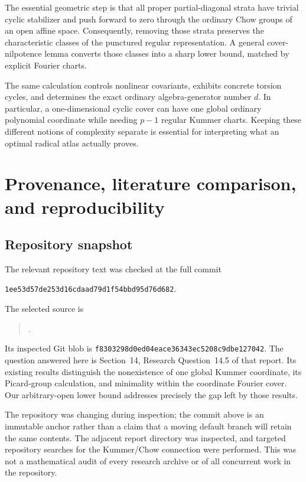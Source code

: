 \documentclass[11pt,a4paper]{article}
\theoremstyle{definition}
\theoremstyle{remark}
\newcommand{\code}[1]{{\small\nolinkurl{#1}}}
\begin{document}
The essential geometric step is that all proper partial-diagonal strata
have trivial cyclic stabilizer and push forward to zero through the
ordinary Chow groups of an open affine space. Consequently, removing
those strata preserves the characteristic classes of the punctured
regular representation. A general cover-nilpotence lemma converts those
classes into a sharp lower bound, matched by explicit Fourier charts.

The same calculation controls nonlinear covariants, exhibits concrete
torsion cycles, and determines the exact ordinary algebra-generator
number $d$. In particular, a one-dimensional cyclic cover can have one
global ordinary polynomial coordinate while needing $p-1$ regular
Kummer charts. Keeping these different notions of complexity separate
is essential for interpreting what an optimal radical atlas actually
proves.

\setcounter{section}{2}
\renewcommand{\thesection}{\Alph{section}}
\makeatletter\gdef{}\gdef\Hy@chapapp{\Hy@appendixstring}\makeatother
\section{Provenance, literature comparison, and reproducibility}
\label{ka:app:provenance}

\subsection{Repository snapshot}
The relevant repository text was checked at the full commit
\begin{center}
\code{1ee53d57de253d16cdaad79d1f54bbd95d76d682}.
\end{center}
The selected source is
\begin{quote}\small
{}\allowbreak
{}.
\end{quote}
Its inspected Git blob is
\code{f8303298d0ed04eace36343ec5208c9dbe127042}.
The question answered here is Section~14, Research Question~14.5 of
that report. Its existing results distinguish the nonexistence of one
global Kummer coordinate, its Picard-group calculation, and minimality
within the coordinate Fourier cover. Our arbitrary-open lower bound
addresses precisely the gap left by those results.

The repository was changing during inspection; the commit above is an
immutable anchor rather than a claim that a moving default branch will
retain the same contents. The adjacent report directory was inspected,
and targeted repository searches for the Kummer/Chow connection were
performed. This was not a mathematical audit of every research archive
or of all concurrent work in the repository.
\end{document}

